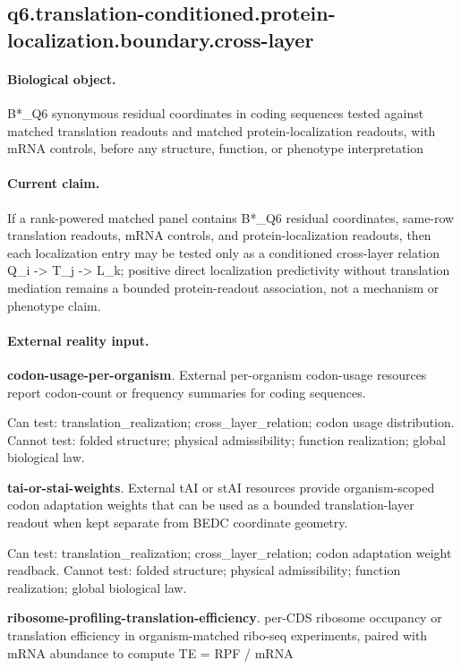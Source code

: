 \subsection{q6.translation-conditioned.protein-localization.boundary.cross-layer}

\paragraph{Biological object.} B*\_Q6 synonymous residual coordinates in coding sequences tested against matched translation readouts and matched protein-localization readouts, with mRNA controls, before any structure, function, or phenotype interpretation

\paragraph{Current claim.} If a rank-powered matched panel contains B*\_Q6 residual coordinates, same-row translation readouts, mRNA controls, and protein-localization readouts, then each localization entry may be tested only as a conditioned cross-layer relation Q\_i -> T\_j -> L\_k; positive direct localization predictivity without translation mediation remains a bounded protein-readout association, not a mechanism or phenotype claim.

\paragraph{External reality input.}
\textbf{codon-usage-per-organism}. External per-organism codon-usage resources report codon-count or frequency summaries for coding sequences.

Can test: translation\_realization; cross\_layer\_relation; codon usage distribution. Cannot test: folded structure; physical admissibility; function realization; global biological law.

\textbf{tai-or-stai-weights}. External tAI or stAI resources provide organism-scoped codon adaptation weights that can be used as a bounded translation-layer readout when kept separate from BEDC coordinate geometry.

Can test: translation\_realization; cross\_layer\_relation; codon adaptation weight readback. Cannot test: folded structure; physical admissibility; function realization; global biological law.

\textbf{ribosome-profiling-translation-efficiency}. per-CDS ribosome occupancy or translation efficiency in organism-matched ribo-seq experiments, paired with mRNA abundance to compute TE = RPF / mRNA

